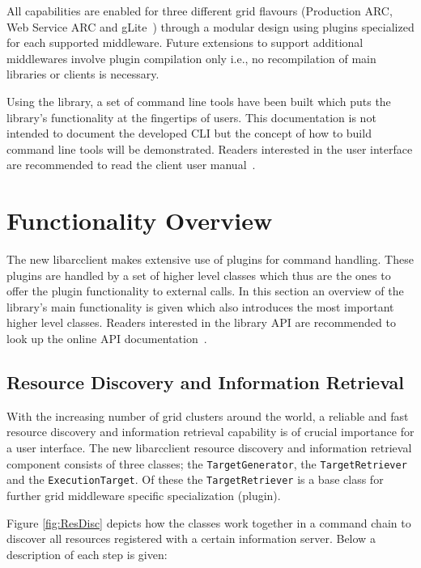 \documentclass{book}
\newcommand{\libarcclient}{libarcclient}
\newcommand{\ExecutionTarget}{\texttt{ExecutionTarget}}
\newcommand{\TargetGenerator}{\texttt{TargetGenerator}}
\newcommand{\TargetRetriever}{\texttt{TargetRetriever}}
\begin{document}
All capabilities are enabled for three different grid flavours
(Production ARC, Web Service ARC and gLite~\cite{glite}) through a
modular design using plugins specialized for each supported
middleware. Future extensions to support additional middlewares
involve plugin compilation only i.e., no recompilation of main
libraries or clients is necessary.

Using the library, a set of command line tools have been built which
puts the library's functionality at the fingertips of users. This
documentation is not intended to document the developed CLI but the
concept of how to build command line tools will be
demonstrated. Readers interested in the user interface are recommended
to read the client user manual~\cite{ui}.

\chapter{Functionality Overview}
\label{sec:FuncOver}

The new {\libarcclient} makes extensive use of plugins for command
handling. These plugins are handled by a set of higher level classes
which thus are the ones to offer the plugin functionality to external
calls. In this section an overview of the library's main functionality
is given which also introduces the most important higher level
classes. Readers interested in the library API are recommended to look
up the online API documentation~\cite{libarcclientAPI}.

\section{Resource Discovery and Information Retrieval}
\label{sec:TargetDiscovery}

With the increasing number of grid clusters around the world, a
reliable and fast resource discovery and information retrieval
capability is of crucial importance for a user interface. The new
{\libarcclient} resource discovery and information retrieval component
consists of three classes; the {\TargetGenerator}, the
{\TargetRetriever} and the {\ExecutionTarget}. Of these the
{\TargetRetriever} is a base class for further grid middleware
specific specialization (plugin).

Figure \ref{fig:ResDisc} depicts how the classes work together in a
command chain to discover all resources registered with a certain
information server. Below a description of each step is given:
\end{document}
